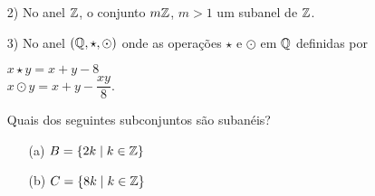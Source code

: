 \documentclass{beamer}
\begin{document}
    \begin{frame}
        \begin{exemplos}
            \begin{enumerate}
                \item[2)] No anel $\mathbb{Z}$, \pause o conjunto $m\mathbb{Z}$, $m > 1$  um subanel de $\mathbb{Z}$.\pause

                \vspace{5cm}
            \end{enumerate}
        \end{exemplos}
    \end{frame}

    \begin{frame}
        \begin{exemplos}
            \begin{enumerate}
                \item[3)] No anel $(\mathbb{Q}, \star, \odot)$ \pause onde as opera\c{c}\~oes $\star$ e $\odot$ em $\mathbb{Q}$ definidas por\pause
                \begin{center}
                    $x \star y = x + y - 8$\\\pause
                    $x \odot y = x + y - \dfrac{xy}{8}.$\pause
                \end{center}
                Quais dos seguintes subconjuntos s\~ao suban\'eis?\pause
                \begin{enumerate}
                    \item[(a)] $B = \{2k \mid k \in \mathbb{Z}\}$\pause

                    \vspace{.5cm}

                    \item[(b)] $C = \{8k \mid k \in \mathbb{Z}\}$\pause
                    \vspace{.5cm}
                \end{enumerate}
            \end{enumerate}
        \end{exemplos}
    \end{frame}
\end{document}
